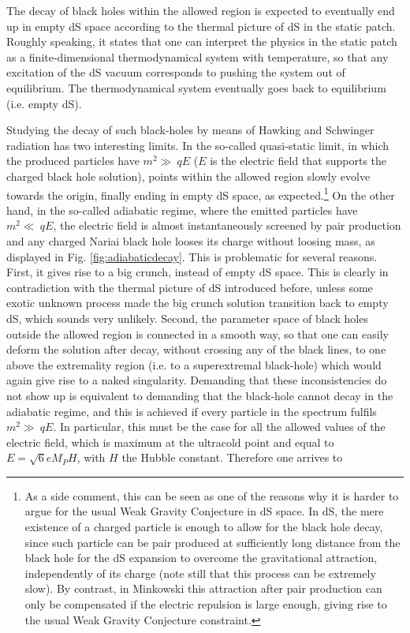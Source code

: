 \documentclass[11pt,a4paper]{article}
\begin{document}
The decay of black holes within the allowed region is expected to eventually end up in empty dS space according to the thermal picture of dS in the static patch. Roughly speaking, it states that one can interpret the physics in the static patch as a finite-dimensional thermodynamical system with temperature, so that any excitation of the dS vacuum corresponds to pushing the system out of equilibrium. The thermodynamical system eventually goes back to equilibrium (i.e. empty dS). 

Studying the decay of such black-holes by means of Hawking and Schwinger radiation has two interesting limits. In the so-called quasi-static limit, in which the produced particles have $m^2 \gg\ q E$ ($E$ is the electric field that supports the charged black hole solution), points within the allowed region slowly evolve towards the origin, finally ending in empty dS space, as expected.\footnote{As a side comment, this can be seen as one of the reasons why it is harder to argue for the usual Weak Gravity Conjecture in dS space. In dS, the mere existence of a charged particle is enough to allow for the black hole decay, since such particle can be pair produced at sufficiently long distance from the black hole for the dS expansion to overcome the gravitational attraction, independently of its charge (note still that this process can be extremely slow). By contrast, in Minkowski this attraction after pair production can only be compensated if the electric repulsion is large enough, giving rise to the usual Weak Gravity Conjecture constraint.} On the other hand, in the so-called adiabatic regime, where the emitted particles have $m^2 \ll \ q E$, the electric field is almost instantaneously screened by pair production and any charged Nariai black hole looses its charge without loosing mass, as displayed in Fig. \ref{fig:adiabaticdecay}. This is problematic for several reasons. First, it gives rise to a big crunch, instead of empty dS space. This is clearly in contradiction with the thermal picture of dS introduced before, unless some exotic unknown process made the big crunch solution transition back to empty dS, which sounds very unlikely. Second, the parameter space of black holes outside the allowed region is connected in a smooth way, so that one can easily deform the solution after decay, without crossing any of the black lines, to one above the extremality region (i.e. to a superextremal black-hole) which would again give rise to a naked singularity. Demanding that these inconsistencies do not show up is equivalent to demanding that the black-hole cannot decay in the adiabatic regime, and this is achieved if every particle in the spectrum fulfils $m^2 \gg \ q E$. In particular, this must be the case for all the allowed values of the electric field, which is maximum at the ultracold point and equal to $E=\sqrt{6}e M_P  H $, with $H$ the Hubble constant. Therefore one arrives to
\end{document}
